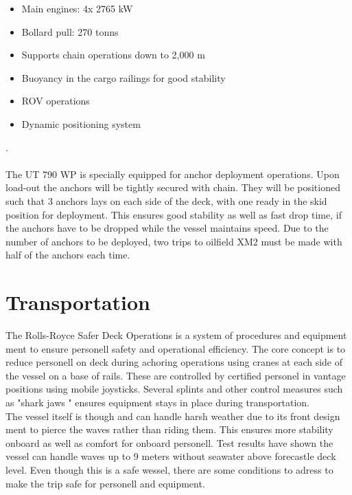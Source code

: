 \documentclass[a4paper,norsk]{article}
\begin{document}
\begin{itemize}
\item Main engines: 4x 2765 kW
\item Bollard pull: 270 tonns
\item Supports chain operations down to 2,000 m
\item Buoyancy in the cargo railings for good stability
\item ROV operations
\item Dynamic positioning system 
\end{itemize}
\vspace{1cm}
.\\ \\ 
The UT 790 WP is specially equipped for anchor deployment operations. Upon load-out the anchors will be tightly secured with chain. They will be positioned such that 3 anchors lays on each side of the deck, with one ready in the skid position for deployment. This ensures good stability as well as fast drop time, if the anchors have to be dropped while the vessel maintains speed.  
Due to the number of anchors to be deployed, two trips to oilfield XM2 must be made with half of the anchors each time.

\newpage
\section*{Transportation}

The Rolls-Royce Safer Deck Operations is a system of procedures and equipment ment to ensure personell safety and operational efficiency. The core concept is to reduce personell on deck during achoring operations using cranes at each side of the vessel on a base of rails. These are controlled by certified personel in vantage positions using mobile joysticks. Several splints and other control measures such as "shark jaws "  ensures equipment stays in place during transportation. \\
The vessel itself is though and can handle harsh weather due to its front design ment to pierce the waves rather than riding them. This ensures more stability onboard as well as comfort for onboard personell. Test results have shown the vessel can handle waves up to 9 meters without seawater above forecastle deck level. Even though this is a safe wessel, there are some conditions to adress to make the trip safe for personell and equipment.     
\end{document}
